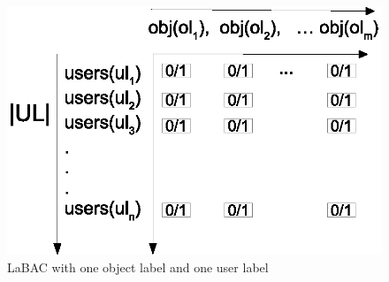  	\begin{figure} 
 		\centering
 		\includegraphics[width=.4\textwidth]{policyspace-labac1}
 		\caption{LaBAC with one object label and one user label}
 		\label{fig:policyspace-labac1}
 	\end{figure}